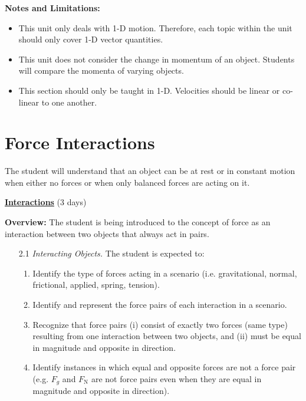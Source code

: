 \documentclass[dvipsnames]{article}
\begin{document}
\textbf{Notes and Limitations:}

\begin{itemize}[topsep=-3pt,itemsep=0pt]
    \item This unit only deals with 1-D motion. Therefore,  each topic within the unit should only cover 1-D vector quantities.
    \item This unit does not consider the change in momentum of an object. Students will compare the momenta of varying objects.
    \item This section should only be taught in 1-D. Velocities should be linear or co-linear to one another.
\end{itemize}



\section{Force Interactions}

\vspace{-3pt}
The student will understand that an object can be at rest or in constant motion when either no forces or when only balanced forces are acting on it.
\vspace{3pt}

\textbf{\underline{Interactions}} (3 days)

\textbf{Overview:} The student is being introduced to the concept of force as an interaction between two objects that always act in pairs.

\begin{enumerate}[itemsep=0pt]
    \item[2.1] \textit{Interacting Objects.} The student is expected to:
    \begin{enumerate}[itemsep=0pt,topsep=0pt]
        \item Identify the type of forces acting in a scenario (i.e. gravitational, normal, frictional, applied, spring, tension).
        \item Identify and represent the force pairs of each interaction in a scenario. 
        \item Recognize that force pairs (i) consist of exactly two forces (same type) resulting from one interaction between two objects, and (ii) must be equal in magnitude and opposite in direction.
        \item Identify instances in which equal and opposite forces are not a force pair (e.g.  $F_g$ and $F_\mathrm{N}$ are not force pairs even when they are equal in magnitude and opposite in direction).
    \end{enumerate}
\end{enumerate}
\end{document}
